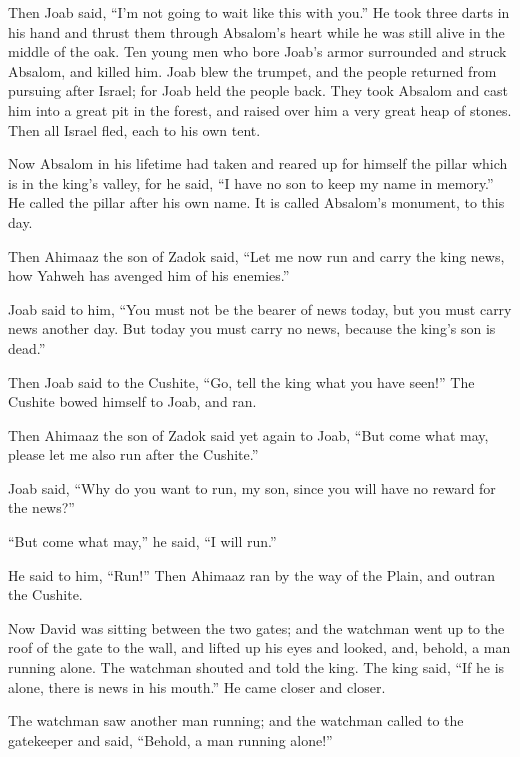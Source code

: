  Then Joab said, ``I'm not going to wait like this with
you.'' He took three darts in his hand and thrust them through Absalom's
heart while he was still alive in the middle of the oak. 
Ten young men who bore Joab's armor surrounded and struck Absalom, and
killed him.  Joab blew the trumpet, and the people
returned from pursuing after Israel; for Joab held the people back.
 They took Absalom and cast him into a great pit in the
forest, and raised over him a very great heap of stones. Then all Israel
fled, each to his own tent.

 Now Absalom in his lifetime had taken and reared up for
himself the pillar which is in the king's valley, for he said, ``I have
no son to keep my name in memory.'' He called the pillar after his own
name. It is called Absalom's monument, to this day.

 Then Ahimaaz the son of Zadok said, ``Let me now run and
carry the king news, how Yahweh has avenged him of his enemies.''

 Joab said to him, ``You must not be the bearer of news
today, but you must carry news another day. But today you must carry no
news, because the king's son is dead.''

 Then Joab said to the Cushite, ``Go, tell the king what
you have seen!'' The Cushite bowed himself to Joab, and ran.

 Then Ahimaaz the son of Zadok said yet again to Joab,
``But come what may, please let me also run after the Cushite.''

Joab said, ``Why do you want to run, my son, since you will have no
reward for the news?''

 ``But come what may,'' he said, ``I will run.''

He said to him, ``Run!'' Then Ahimaaz ran by the way of the Plain, and
outran the Cushite.

 Now David was sitting between the two gates; and the
watchman went up to the roof of the gate to the wall, and lifted up his
eyes and looked, and, behold, a man running alone.  The
watchman shouted and told the king. The king said, ``If he is alone,
there is news in his mouth.'' He came closer and closer.

 The watchman saw another man running; and the watchman
called to the gatekeeper and said, ``Behold, a man running alone!''

